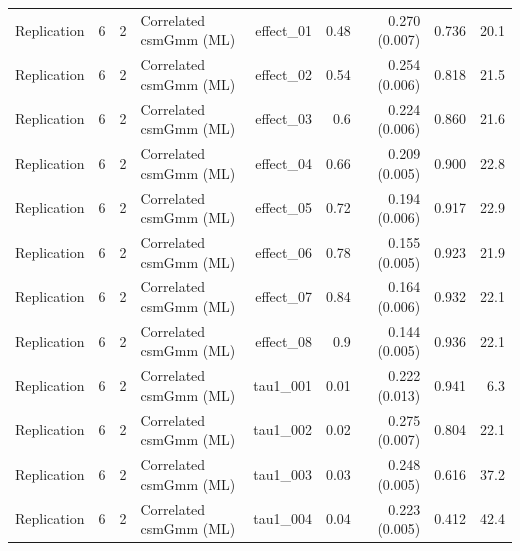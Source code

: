 \begin{longtable}{lcclrrrrr}
Replication & 6 & 2 & Correlated csmGmm (ML) & effect\_01 & 0.48 & 0.270 (0.007) & 0.736 & 20.1\\
Replication & 6 & 2 & Correlated csmGmm (ML) & effect\_02 & 0.54 & 0.254 (0.006) & 0.818 & 21.5\\
Replication & 6 & 2 & Correlated csmGmm (ML) & effect\_03 & 0.6 & 0.224 (0.006) & 0.860 & 21.6\\
Replication & 6 & 2 & Correlated csmGmm (ML) & effect\_04 & 0.66 & 0.209 (0.005) & 0.900 & 22.8\\
Replication & 6 & 2 & Correlated csmGmm (ML) & effect\_05 & 0.72 & 0.194 (0.006) & 0.917 & 22.9\\
Replication & 6 & 2 & Correlated csmGmm (ML) & effect\_06 & 0.78 & 0.155 (0.005) & 0.923 & 21.9\\
Replication & 6 & 2 & Correlated csmGmm (ML) & effect\_07 & 0.84 & 0.164 (0.006) & 0.932 & 22.1\\
Replication & 6 & 2 & Correlated csmGmm (ML) & effect\_08 & 0.9 & 0.144 (0.005) & 0.936 & 22.1\\
Replication & 6 & 2 & Correlated csmGmm (ML) & tau1\_001 & 0.01 & 0.222 (0.013) & 0.941 & 6.3\\
Replication & 6 & 2 & Correlated csmGmm (ML) & tau1\_002 & 0.02 & 0.275 (0.007) & 0.804 & 22.1\\
Replication & 6 & 2 & Correlated csmGmm (ML) & tau1\_003 & 0.03 & 0.248 (0.005) & 0.616 & 37.2\\
Replication & 6 & 2 & Correlated csmGmm (ML) & tau1\_004 & 0.04 & 0.223 (0.005) & 0.412 & 42.4\\
\bottomrule
\end{longtable}
